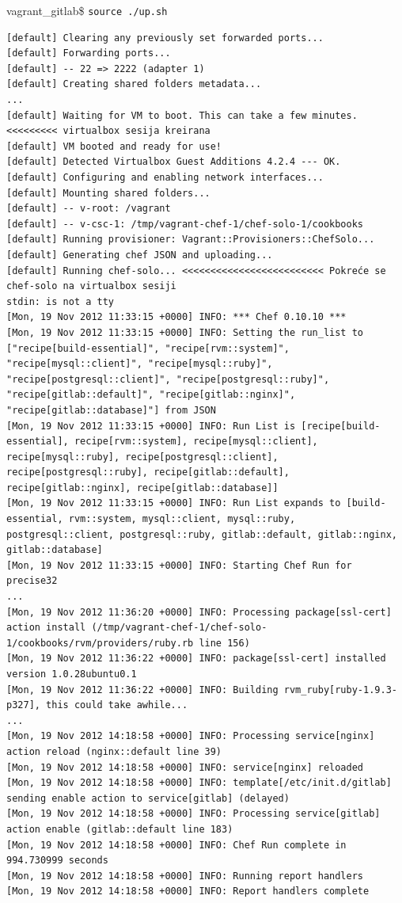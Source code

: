 \documentclass[times, utf8, seminar]{fit}
\begin{document}
vagrant\_gitlab\$ \verb+source ./up.sh+
\begin{lstlisting}
[default] Clearing any previously set forwarded ports...
[default] Forwarding ports...
[default] -- 22 => 2222 (adapter 1)
[default] Creating shared folders metadata...
...
[default] Waiting for VM to boot. This can take a few minutes. <<<<<<<<< virtualbox sesija kreirana
[default] VM booted and ready for use!
[default] Detected Virtualbox Guest Additions 4.2.4 --- OK.
[default] Configuring and enabling network interfaces...
[default] Mounting shared folders...
[default] -- v-root: /vagrant
[default] -- v-csc-1: /tmp/vagrant-chef-1/chef-solo-1/cookbooks
[default] Running provisioner: Vagrant::Provisioners::ChefSolo...
[default] Generating chef JSON and uploading...
[default] Running chef-solo... <<<<<<<<<<<<<<<<<<<<<<<<< Pokreće se chef-solo na virtualbox sesiji
stdin: is not a tty
[Mon, 19 Nov 2012 11:33:15 +0000] INFO: *** Chef 0.10.10 ***
[Mon, 19 Nov 2012 11:33:15 +0000] INFO: Setting the run_list to ["recipe[build-essential]", "recipe[rvm::system]", "recipe[mysql::client]", "recipe[mysql::ruby]", "recipe[postgresql::client]", "recipe[postgresql::ruby]", "recipe[gitlab::default]", "recipe[gitlab::nginx]", "recipe[gitlab::database]"] from JSON
[Mon, 19 Nov 2012 11:33:15 +0000] INFO: Run List is [recipe[build-essential], recipe[rvm::system], recipe[mysql::client], recipe[mysql::ruby], recipe[postgresql::client], recipe[postgresql::ruby], recipe[gitlab::default], recipe[gitlab::nginx], recipe[gitlab::database]]
[Mon, 19 Nov 2012 11:33:15 +0000] INFO: Run List expands to [build-essential, rvm::system, mysql::client, mysql::ruby, postgresql::client, postgresql::ruby, gitlab::default, gitlab::nginx, gitlab::database]
[Mon, 19 Nov 2012 11:33:15 +0000] INFO: Starting Chef Run for precise32
...
[Mon, 19 Nov 2012 11:36:20 +0000] INFO: Processing package[ssl-cert] action install (/tmp/vagrant-chef-1/chef-solo-1/cookbooks/rvm/providers/ruby.rb line 156)
[Mon, 19 Nov 2012 11:36:22 +0000] INFO: package[ssl-cert] installed version 1.0.28ubuntu0.1
[Mon, 19 Nov 2012 11:36:22 +0000] INFO: Building rvm_ruby[ruby-1.9.3-p327], this could take awhile...
...
[Mon, 19 Nov 2012 14:18:58 +0000] INFO: Processing service[nginx] action reload (nginx::default line 39)
[Mon, 19 Nov 2012 14:18:58 +0000] INFO: service[nginx] reloaded
[Mon, 19 Nov 2012 14:18:58 +0000] INFO: template[/etc/init.d/gitlab] sending enable action to service[gitlab] (delayed)
[Mon, 19 Nov 2012 14:18:58 +0000] INFO: Processing service[gitlab] action enable (gitlab::default line 183)
[Mon, 19 Nov 2012 14:18:58 +0000] INFO: Chef Run complete in 994.730999 seconds
[Mon, 19 Nov 2012 14:18:58 +0000] INFO: Running report handlers
[Mon, 19 Nov 2012 14:18:58 +0000] INFO: Report handlers complete
\end{lstlisting}
\end{document}
